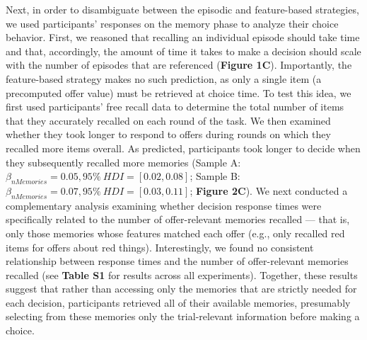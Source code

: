 \documentclass[10pt,letterpaper]{article}
\begin{document}
Next, in order to disambiguate between the episodic and feature-based strategies, we used participants' responses on the memory phase to analyze their choice behavior. First, we reasoned that recalling an individual episode should take time\cite{ratcliffTheoryMemoryRetrieval1978, sederbergContextbasedTheoryRecency2008, kahanaFoundationsHumanMemory2012} and that, accordingly, the amount of time it takes to make a decision should scale with the number of episodes that are referenced (\textbf{Figure 1C}). Importantly, the feature-based strategy makes no such prediction, as only a single item (a precomputed offer value) must be retrieved at choice time. To test this idea, we first used participants' free recall data to determine the total number of items that they accurately recalled on each round of the task. We then examined whether they took longer to respond to offers during rounds on which they recalled more items overall. As predicted, participants took longer to decide when they subsequently recalled more memories (Sample A: $\beta_{nMemories} = 0.05, 95\% \ HDI = [0.02, 0.08]$; Sample B: $\beta_{nMemories} = 0.07, 95\% \ HDI = [0.03, 0.11]$; \textbf{Figure 2C}). We next conducted a complementary analysis examining whether decision response times were specifically related to the number of offer-relevant memories recalled --- that is, only those memories whose features matched each offer (e.g., only recalled red items for offers about red things). Interestingly, we found no consistent relationship between response times and the number of offer-relevant memories recalled (see \textbf{Table S1} for results across all experiments). Together, these results suggest that rather than accessing only the memories that are strictly needed for each decision, participants retrieved all of their available memories, presumably selecting from these memories only the trial-relevant information before making a choice.
\end{document}
